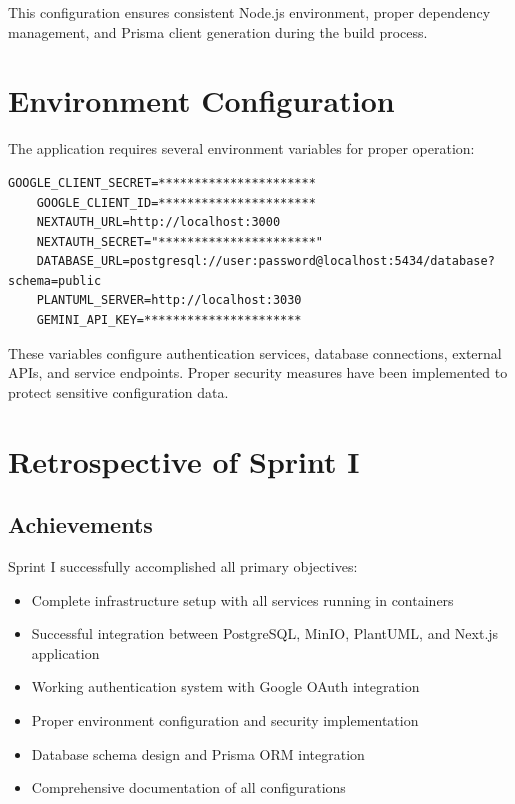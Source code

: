 This configuration ensures consistent Node.js environment, proper dependency management, and Prisma client generation during the build process.

\section{Environment Configuration}

The application requires several environment variables for proper operation:

\begin{lstlisting}[caption=Environment Variables Configuration]
    GOOGLE_CLIENT_SECRET=**********************
    GOOGLE_CLIENT_ID=**********************
    NEXTAUTH_URL=http://localhost:3000
    NEXTAUTH_SECRET="**********************"
    DATABASE_URL=postgresql://user:password@localhost:5434/database?schema=public
    PLANTUML_SERVER=http://localhost:3030
    GEMINI_API_KEY=**********************
\end{lstlisting}

These variables configure authentication services, database connections, external APIs, and service endpoints. Proper security measures have been implemented to protect sensitive configuration data.

\section{Retrospective of Sprint I}

\subsection{Achievements}

Sprint I successfully accomplished all primary objectives:

\begin{itemize}
    \item Complete infrastructure setup with all services running in containers
    \item Successful integration between PostgreSQL, MinIO, PlantUML, and Next.js application
    \item Working authentication system with Google OAuth integration
    \item Proper environment configuration and security implementation
    \item Database schema design and Prisma ORM integration
    \item Comprehensive documentation of all configurations
\end{itemize}

